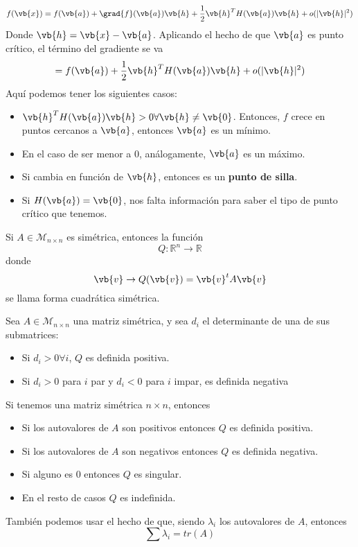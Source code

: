 \documentclass{../Calculo.tex}
\begin{document}
\[
	f(\vb{x}) = f(\vb{a}) + \grad{f} (\vb{a}) \vb{h} +\frac{1}{2} \vb{h}^{T}H(\vb{a}) \vb{h} +o(|\vb{h}|^{2})
\]
Donde $\vb{h}=\vb{x}-\vb{a}$. Aplicando el hecho de que $\vb{a}$ es punto crítico, el término del gradiente se va
\[
	= f(\vb{a}) +\frac{1}{2} \vb{h}^{T} H(\vb{a}) \vb{h}+ o(|\vb{h}|^{2})
\]
Aquí podemos tener los siguientes casos:
\begin{itemize}
	\item $\vb{h}^{T} H(\vb{a})\vb{h} > 0 \forall \vb{h} \neq \vb{0}$. Entonces, $f$ crece en puntos cercanos a $\vb{a}$, entonces $\vb{a}$ es un mínimo.
	\item En el caso de ser menor a $0$, análogamente, $\vb{a}$ es un máximo.
	\item Si cambia en función de $\vb{h}$, entonces es un \textbf{punto de silla}.   
	\item Si $H(\vb{a})= \vb{0}$, nos falta información para saber el tipo de punto crítico que tenemos. 
\end{itemize}
\begin{defin}
	Si $A \in \mathcal{M}_{n \times n}$ es simétrica, entonces la función
	\[
		Q: \mathbb{R}^{n} \to \mathbb{R}
	\]
	donde
	\[
		\vb{v} \to Q(\vb{v})=\vb{v}^{t}A \vb{v}
	\]
	se llama forma cuadrática simétrica.
\end{defin}
\begin{teorema}
	Sea $A \in \mathcal{M}_{n \times  n}$ una matriz simétrica, y sea $d_{i}$ el determinante de una de sus submatrices:
	\begin{itemize}
		\item Si $d_{i} > 0 \forall i$, $Q$ es definida positiva.
		\item Si $d_{i} > 0$ para $i$ par y $d_{i} < 0$ para $i$ impar, es definida negativa     
	\end{itemize}
\end{teorema}
\begin{teorema}
	Si tenemos una matriz simétrica $n \times n$, entonces
	\begin{itemize}
		\item Si los autovalores de $A$ son positivos entonces $Q$ es definida positiva.
		\item Si los autovalores de $A$ son negativos entonces $Q$ es definida negativa.
		\item Si alguno es $0$ entonces $Q$ es singular.
		\item En el resto de casos $Q$ es indefinida. 
	\end{itemize}
	También podemos usar el hecho de que, siendo $\lambda_{i}$ los autovalores de $A$, entonces
	\[
		\sum \lambda_{i} = tr(A)
	\]
\end{teorema}
\end{document}
